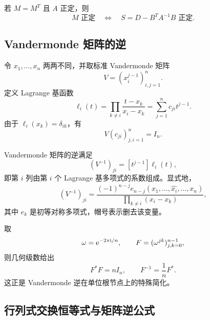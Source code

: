 \begin{corollary}
若 $M=M^T$ 且 $A$ 正定，则
\begin{equation}
 M\text{ 正定}
 \quad\Longleftrightarrow\quad
 S=D-B^TA^{-1}B\text{ 正定}.
\end{equation}
\end{corollary}

\subsection{Vandermonde 矩阵的逆}

令 $x_1,\ldots,x_n$ 两两不同，并取标准 Vandermonde 矩阵
\begin{equation}
 V=(x_i^{j-1})_{i,j=1}^n.
\end{equation}
定义 Lagrange 基函数
\begin{equation}
 \ell_i(t)=\prod_{k\neq i}\frac{t-x_k}{x_i-x_k}
 =\sum_{j=1}^n c_{ji}t^{j-1}.
\end{equation}
由于 $\ell_i(x_k)=\delta_{ik}$，有
\begin{equation}
 V(c_{ji})_{j,i=1}^n=I_n.
\end{equation}

\begin{theorem}
Vandermonde 矩阵的逆满足
\begin{equation}
 (V^{-1})_{ji}=[t^{j-1}]\ell_i(t),
\end{equation}
即第 $i$ 列由第 $i$ 个 Lagrange 基多项式的系数组成。显式地，
\begin{equation}
 (V^{-1})_{ji}
 =\frac{(-1)^{n-j}
 e_{n-j}(x_1,\ldots,\widehat{x_i},\ldots,x_n)}
 {\prod_{k\neq i}(x_i-x_k)},
\end{equation}
其中 $e_k$ 是初等对称多项式，帽号表示删去该变量。
\end{theorem}

\begin{remark}[单位根情形]
取
\begin{equation}
 \omega=\mathrm e^{-2\pi\mathrm i/n},
 \qquad
 F=(\omega^{jk})_{j,k=0}^{n-1},
\end{equation}
则几何级数给出
\begin{equation}
 F^*F=nI_n,
 \qquad
 F^{-1}=\frac1nF^*.
\end{equation}
这正是 Vandermonde 逆在单位根节点上的特殊简化。
\end{remark}

\subsection{行列式交换恒等式与矩阵逆公式}

